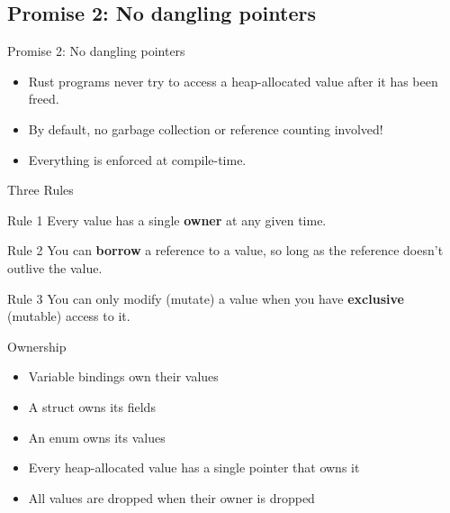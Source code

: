 \subsection{Promise 2: No dangling pointers}


\begin{frame}{Promise 2: No dangling pointers}

\begin{itemize}
	\item Rust programs never try to access a heap-allocated value after it has
		been freed.
	\item By default, no garbage collection or reference counting involved!
	\item Everything is enforced at compile-time.
\end{itemize}

\end{frame}


\begin{frame}[label={threerules}]{Three Rules}

\begin{block}{Rule 1}
Every value has a single \textbf{owner} at any given time.
\end{block}
\pause
\begin{block}{Rule 2}
You can \textbf{borrow} a reference to a value, so long as the
reference doesn’t outlive the value.
\end{block}
\pause
\begin{block}{Rule 3}
You can only modify (mutate) a value when you have \textbf{exclusive}
(mutable) access to it.
\end{block}

\end{frame}


\begin{frame}{Ownership}

\begin{itemize}
	\item Variable bindings own their values
	\item A struct owns its fields
	\item An enum owns its values
	\item Every heap-allocated value has a single pointer that owns it
	\item All values are dropped when their owner is dropped
\end{itemize}

\end{frame}

